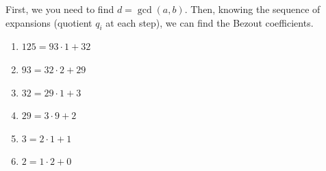 \documentclass[../../book.tex]{subfiles}
\begin{document}
\begin{example} 
    \hfill

    First, we you need to find $d = \gcd(a,b)$. Then, knowing the sequence of
    expansions (quotient $q_i$ at each step), we can find the Bezout
    coefficients. 

    \hfill

    \begin{minipage}{0.35\textwidth}
        \raggedright
        \vspace*{\fill}
            \begin{enumerate}
                \item $125 = 93 \cdot 1 + 32$
                \item $93 = 32 \cdot 2 + 29$
                \item $32 = 29 \cdot 1 + 3$
                \item $29 = 3 \cdot 9 + 2$
                \item $3 = 2 \cdot 1 + 1$
                \item $2 = 1 \cdot 2 + 0$        
            \end{enumerate}
        \vspace*{\fill}
    \end{minipage}
    \begin{minipage}{0.75\textwidth}
\end{minipage}
\end{example}
\end{document}
